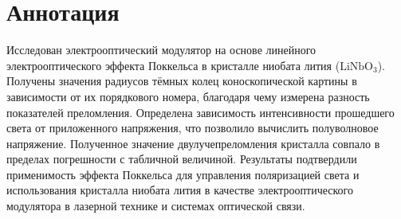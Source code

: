 \chapter*{Аннотация} \vspace{-20pt}

Исследован электрооптический модулятор на основе линейного электрооптического эффекта Поккельса в кристалле ниобата лития ($\text{LiNbO}_3$). Получены значения радиусов тёмных колец коноскопической картины в зависимости от их порядкового номера, благодаря чему измерена разность показателей преломления. Определена зависимость интенсивности прошедшего света от приложенного напряжения, что позволило вычислить полуволновое напряжение. Полученное значение двулучепреломления кристалла совпало в пределах погрешности с табличной величиной. Результаты подтвердили применимость эффекта Поккельса для управления поляризацией света и использования кристалла ниобата лития в качестве электрооптического модулятора в лазерной технике и системах оптической связи.
